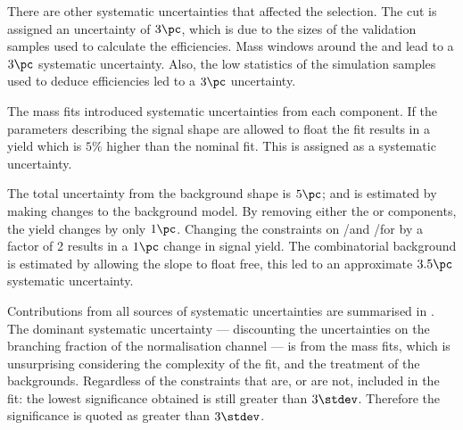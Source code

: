 
There are other systematic uncertainties that affected the selection.
The \bdt cut is assigned an uncertainty of $3\pc$, which is due to the sizes of the
validation samples used to calculate the efficiencies.
Mass windows around the \Ds and \phii lead to a $3\pc$ systematic uncertainty.
Also, the low statistics of the simulation samples used to deduce efficiencies led to a $3\pc$
uncertainty.

The mass fits introduced systematic uncertainties from each component.
If the parameters describing the signal shape are allowed to float the fit results in a yield which is
$5\%$ higher than the nominal fit.
This is assigned as a systematic uncertainty.


The total uncertainty from the background shape is $5\pc$; and is estimated by making changes to
the background model.
By removing either the \btodsstrphi or \bstodsstrkstrk components, the yield changes by only $1\pc$.
Changing the constraints on \rA/\rB and \rC/\rD for \bstodskstrk by a factor of 2 results in a
$1\pc$ change in signal yield.
The combinatorial background is estimated by allowing the slope to float free, this led to an
approximate $3.5\pc$ systematic uncertainty.


Contributions from all sources of systematic uncertainties are summarised in .
The dominant systematic uncertainty --- discounting the uncertainties on the branching fraction of
the normalisation channel --- is from the mass fits, which is unsurprising considering the
complexity of the fit, and the treatment of the backgrounds.
Regardless of the constraints that are, or are not, included in the fit: the lowest
significance obtained is still greater than $3\stdev$.
Therefore the significance is quoted as greater than $3\stdev$.

